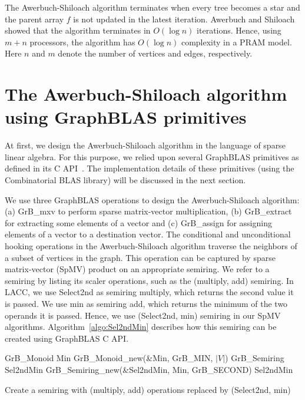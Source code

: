 The Awerbuch-Shiloach algorithm terminates when every tree becomes a star and the parent array $f$ is not updated in the latest iteration. 
Awerbuch and Shiloach showed that the algorithm terminates in $O(\log n)$ iterations. Hence, using $m+n$ processors, the algorithm has $O(\log n)$ complexity in a PRAM model. 
Here $n$ and $m$ denote the number of vertices and edges, respectively. 




\section{The Awerbuch-Shiloach algorithm using GraphBLAS primitives}
\label{sec:LACC}
At first, we design the Awerbuch-Shiloach algorithm in the language of sparse linear algebra.
For this purpose, we relied upon several GraphBLAS primitives as defined in its C API~\cite{bulucc2017design}.
The implementation details of these primitives (using the Combinatorial BLAS library) will be discussed in the next section.

We use three GraphBLAS operations to design the Awerbuch-Shiloach algorithm: (a) GrB\_mxv to perform sparse matrix-vector multiplication, (b) GrB\_extract for extracting some elements of a vector and (c) GrB\_assign for assigning elements of a vector to a destination vector. 
The conditional and unconditional hooking operations in the Awerbuch-Shiloach algorithm traverse the neighbors of a subset of vertices  in the graph. This operation can be captured by sparse matrix-vector (SpMV) product on an appropriate semiring.  
We refer to a semiring by listing its scaler operations, such as the (multiply, add) semiring. 
In LACC, we use Select2nd as semiring multiply, which returns the second value it is passed. 
We use min as semiring add, which returns the minimum of the two operands it is passed.
Hence, we use (Select2nd, min) semiring in our SpMV algorithms. 
Algorithm~\ref{algo:Sel2ndMin} describes how this semiring can be created using GraphBLAS C API.

\begin{algorithm}[htbp]
\begin{algorithmic}[1]
\begin{small}
	\State GrB\_Monoid Min
	\State GrB\_Monoid\_new(\&Min, GrB\_MIN, $\lvert V \rvert$)
	\State GrB\_Semiring Sel2ndMin
	\State GrB\_Semiring\_new(\&Sel2ndMin, Min, GrB\_SECOND)
	\State \Return Sel2ndMin
\EndProcedure
\end{small}
\end{algorithmic}
\caption{Create a semiring with (multiply, add) operations replaced by (Select2nd, min)}
\label{algo:Sel2ndMin}
\end{algorithm}



